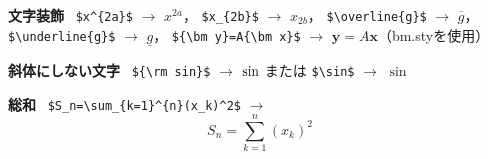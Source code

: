 \begin{flushleft}
\noindent \textbf{文字装飾} \
\verb+$x^{2a}$+ $\rightarrow$ $x^{2a}$，
\verb+$x_{2b}$+ $\rightarrow$ $x_{2b}$，
\verb+$\overline{g}$+ $\rightarrow$ $\overline{g}$，
\verb+$\underline{g}$+ $\rightarrow$ $\underline{g}$，
\verb+${\bm y}=A{\bm x}$+ $\rightarrow$ ${\bm y}=A{\bm x}$（bm.styを使用）
\end{flushleft}

\noindent \textbf{斜体にしない文字} \
\verb+${\rm sin}$+ $\rightarrow$ ${\rm sin}$
または
\verb+$\sin$+ $\rightarrow$ $\sin$

\noindent \textbf{総和} \
\verb+$S_n=\sum_{k=1}^{n}(x_k)^2$+ $\rightarrow$
\begin{equation*}
  S_n=\sum_{k=1}^{n}(x_k)^2
\end{equation*}
